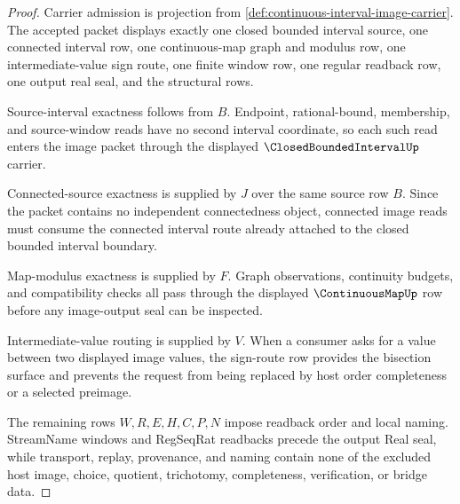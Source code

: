 \begin{proof}
Carrier admission is projection from \autoref{def:continuous-interval-image-carrier}. The accepted packet displays exactly one closed bounded interval source, one connected interval row, one continuous-map graph and modulus row, one intermediate-value sign route, one finite window row, one regular readback row, one output real seal, and the structural rows.

Source-interval exactness follows from $B$. Endpoint, rational-bound, membership, and source-window reads have no second interval coordinate, so each such read enters the image packet through the displayed $\ClosedBoundedIntervalUp$ carrier.

Connected-source exactness is supplied by $J$ over the same source row $B$. Since the packet contains no independent connectedness object, connected image reads must consume the connected interval route already attached to the closed bounded interval boundary.

Map-modulus exactness is supplied by $F$. Graph observations, continuity budgets, and compatibility checks all pass through the displayed $\ContinuousMapUp$ row before any image-output seal can be inspected.

Intermediate-value routing is supplied by $V$. When a consumer asks for a value between two displayed image values, the sign-route row provides the bisection surface and prevents the request from being replaced by host order completeness or a selected preimage.

The remaining rows $W,R,E,H,C,P,N$ impose readback order and local naming. StreamName windows and RegSeqRat readbacks precede the output Real seal, while transport, replay, provenance, and naming contain none of the excluded host image, choice, quotient, trichotomy, completeness, verification, or bridge data.
\end{proof}

